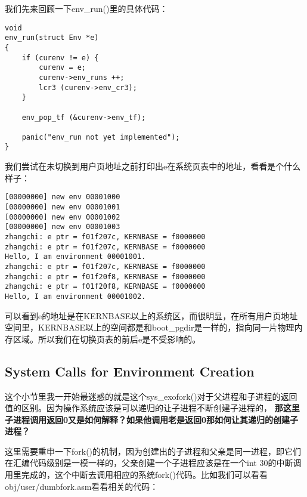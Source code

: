 \documentclass{article}
\newcommand{\highlight}[1]{{\bfseries \color{red}  #1}}
\newcommand{\funcname}[1]{{\ttfamily \small #1}}
\begin{document}
\begin{CJK*}{UTF8}{gkai}
我们先来回顾一下\funcname{env\_run()}里的具体代码：


\begin{lstlisting}[style=ccode, title={\scriptsize \ttfamily \bfseries kern/env.c: env\_run()}]
void
env_run(struct Env *e)
{
    if (curenv != e) {
        curenv = e;
        curenv->env_runs ++;
        lcr3 (curenv->env_cr3);
    }

    env_pop_tf (&curenv->env_tf);

    panic("env_run not yet implemented");
}
\end{lstlisting}

我们尝试在未切换到用户页地址之前打印出e在系统页表中的地址，看看是个什么样子：

\begin{lstlisting}[style=console]
[00000000] new env 00001000
[00000000] new env 00001001
[00000000] new env 00001002
[00000000] new env 00001003
zhangchi: e ptr = f01f207c, KERNBASE = f0000000
zhangchi: e ptr = f01f207c, KERNBASE = f0000000
Hello, I am environment 00001001.
zhangchi: e ptr = f01f207c, KERNBASE = f0000000
zhangchi: e ptr = f01f20f8, KERNBASE = f0000000
zhangchi: e ptr = f01f20f8, KERNBASE = f0000000
Hello, I am environment 00001002.
\end{lstlisting}

可以看到e的地址是在KERNBASE以上的系统区，而很明显，在所有用户页地址空间里，KERNBASE以上的空间都是和boot\_pgdir是一样的，指向同一片物理内存区域。所以我们在切换页表的前后e是不受影响的。

\subsection{System Calls for Environment Creation}

这个小节里我一开始最迷惑的就是这个\funcname{sys\_exofork()}对于父进程和子进程的返回值的区别。因为操作系统应该是可以递归的让子进程不断创建子进程的，\highlight{那这里子进程调用返回0又是如何解释？如果他调用老是返回0那如何让其递归的创建子进程？}

这里需要重申一下\funcname{fork()}的机制，因为创建出的子进程和父亲是同一进程，即它们在汇编代码级别是一模一样的，父亲创建一个子进程应该是在一个int 30的中断调用里完成的，这个中断去调用相应的系统\funcname{fork()}代码。比如我们可以看看obj/user/dumbfork.asm看看相关的代码：


\end{CJK*}
\end{document}
